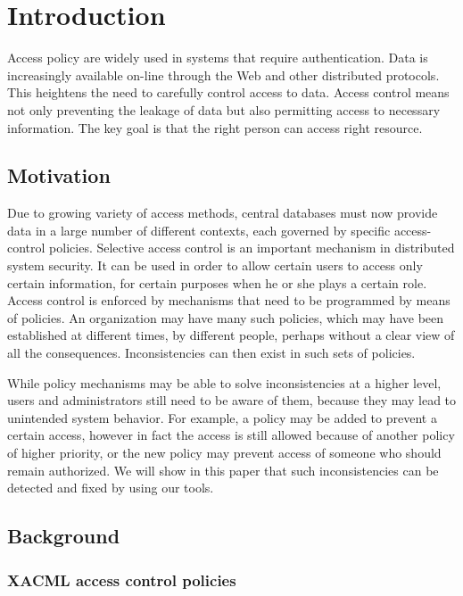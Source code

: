 \documentclass{acm_proc_article-sp}
\begin{document}

\section{Introduction}


Access policy are widely used in systems that require authentication. Data is increasingly available on-line through the Web and other distributed protocols. This heightens the need to carefully control access to data. Access control means not only preventing the leakage of data but also permitting access to necessary information. The key goal is that the right person can access right resource.

\subsection{Motivation}

Due to growing variety of access methods, central databases must now provide data in a
large number of different contexts, each governed by specific access-control policies. Selective access control is an important mechanism in distributed system security. It can be used in order to allow certain users to access only certain information, for certain purposes when he or she plays a certain role. Access control is enforced by mechanisms that need to be programmed by means of policies. An organization may have many such policies, which may have been established at different times, by different people, perhaps without a clear view of all the consequences. Inconsistencies can then exist in such sets of policies. 

While policy mechanisms may be able to solve inconsistencies at a higher level, users and administrators still need to be aware of them, because they may lead to unintended system behavior. For example, a policy may be added to prevent a certain access, however in fact the access is still allowed because of another policy of higher priority, or the new policy may prevent access of someone who should remain authorized. We will show in this paper that such inconsistencies can be detected and fixed by using our tools.

\subsection{Background}

\subsubsection{XACML access control policies}
\end{document}
